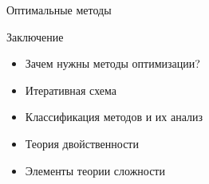 \documentclass[12pt]{beamer}
\begin{document}
\begin{frame}{Оптимальные методы}

\end{frame}

\begin{frame}{Заключение}

\begin{itemize}
\item Зачем нужны методы оптимизации?
\item Итеративная схема
\item Классификация методов и их анализ
\item Теория двойственности
\item Элементы теории сложности
\end{itemize}
\end{frame}
\end{document}
